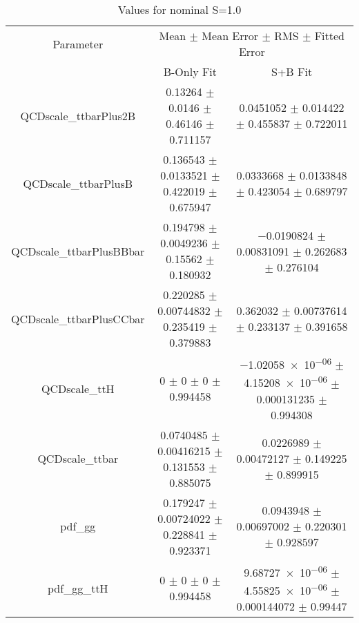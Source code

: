 \begin{table}
\centering
\caption{Values for nominal S=1.0}
\begin{tabular}{ccc}
\toprule
Parameter & \multicolumn{2}{c}{Mean $\pm$ Mean Error $\pm$ RMS $\pm$ Fitted Error}\\
 & B-Only Fit & S+B Fit\\
\midrule
QCDscale\_ttbarPlus2B & \num{0.13264} $\pm$ \num{0.0146} $\pm$ \num{0.46146} $\pm$ \num{0.711157} & \num{0.0451052} $\pm$ \num{0.014422} $\pm$ \num{0.455837} $\pm$ \num{0.722011}\\
QCDscale\_ttbarPlusB & \num{0.136543} $\pm$ \num{0.0133521} $\pm$ \num{0.422019} $\pm$ \num{0.675947} & \num{0.0333668} $\pm$ \num{0.0133848} $\pm$ \num{0.423054} $\pm$ \num{0.689797}\\
QCDscale\_ttbarPlusBBbar & \num{0.194798} $\pm$ \num{0.0049236} $\pm$ \num{0.15562} $\pm$ \num{0.180932} & \num{-0.0190824} $\pm$ \num{0.00831091} $\pm$ \num{0.262683} $\pm$ \num{0.276104}\\
QCDscale\_ttbarPlusCCbar & \num{0.220285} $\pm$ \num{0.00744832} $\pm$ \num{0.235419} $\pm$ \num{0.379883} & \num{0.362032} $\pm$ \num{0.00737614} $\pm$ \num{0.233137} $\pm$ \num{0.391658}\\
QCDscale\_ttH & \num{0} $\pm$ \num{0} $\pm$ \num{0} $\pm$ \num{0.994458} & \num{-1.02058e-06} $\pm$ \num{4.15208e-06} $\pm$ \num{0.000131235} $\pm$ \num{0.994308}\\
QCDscale\_ttbar & \num{0.0740485} $\pm$ \num{0.00416215} $\pm$ \num{0.131553} $\pm$ \num{0.885075} & \num{0.0226989} $\pm$ \num{0.00472127} $\pm$ \num{0.149225} $\pm$ \num{0.899915}\\
pdf\_gg & \num{0.179247} $\pm$ \num{0.00724022} $\pm$ \num{0.228841} $\pm$ \num{0.923371} & \num{0.0943948} $\pm$ \num{0.00697002} $\pm$ \num{0.220301} $\pm$ \num{0.928597}\\
pdf\_gg\_ttH & \num{0} $\pm$ \num{0} $\pm$ \num{0} $\pm$ \num{0.994458} & \num{9.68727e-06} $\pm$ \num{4.55825e-06} $\pm$ \num{0.000144072} $\pm$ \num{0.99447}\\
\bottomrule
\end{tabular}
\end{table}